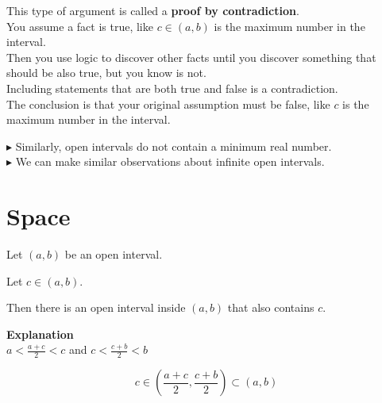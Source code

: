 \documentclass{ximera}
\begin{document}
\begin{paradox}

This type of argument is called a \textbf{proof by contradiction}.   \\

You assume a fact is true, like $c \in (a,b)$ is the maximum number in the interval.  \\

Then you use logic to discover other facts until you discover something that should be also true, but you know is not. \\

Including statements that are both true and false is a contradiction. \\

The conclusion is that your original assumption must be false, like $c$ is the maximum number in the interval.


\end{paradox}








$\blacktriangleright$ Similarly, open intervals do not contain a minimum real number. \\


$\blacktriangleright$ We can make similar observations about infinite open intervals. \\





\section{Space}

\begin{observation} 


Let $(a,b)$ be an open interval.

Let $c \in (a,b)$.

Then there is an open interval inside $(a,b)$ that also contains $c$.

\textbf{\textcolor{purple!50!blue!90!black}{Explanation}} \\







$a < \frac{a+c}{2} < c$ and  $c < \frac{c+b}{2}  < b$



\[   c \in \left(\frac{a+c}{2} , \frac{c+b}{2} \right) \subset (a,b)              \]


\end{observation}
\end{document}
